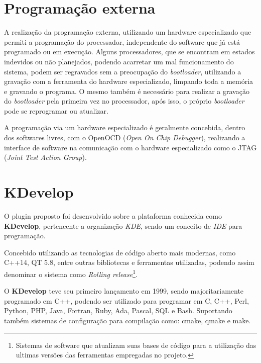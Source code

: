 

\section{Programação externa}
A realização da programação externa, utilizando um hardware especializado que  permiti a programação do processador, independente do software que já está programado ou em execução. Alguns processadores, que se encontram em estados indevidos ou não planejados, podendo acarretar um mal funcionamento do sistema, podem ser regravados sem a preocupação do \textit{bootloader}, utilizando a gravação com a ferramenta do hardware especializado, limpando toda a memória e gravando o programa. O mesmo também é necessário para realizar a gravação do \textit{bootloader} pela primeira vez no processador, após isso, o próprio \textit{bootloader} pode se reprogramar ou atualizar.

A programação via um hardware especializado é geralmente concebida, dentro dos softwares livres, com o OpenOCD (\textit{Open On Chip Debugger})\cite{openocd}, realizando a interface de software na comunicação com o hardware especializado como o JTAG (\textit{Joint Test Action Group}).


\section{KDevelop}
O plugin proposto foi desenvolvido sobre a plataforma conhecida como \textbf{KDevelop}, pertencente a organização \textit{KDE},
sendo um conceito de \textit{IDE} para programação.

Concebido utilizando as tecnologias de código aberto mais modernas, como C++14, QT 5.8, entre outras bibliotecas e ferramentas
utilizadas, podendo assim denominar o sistema como \textit{Rolling release}\footnote{Sistemas de software que atualizam suas bases
de código para a utilização das ultimas versões das ferramentas empregadas no projeto.}.

O \textbf{KDevelop} teve seu primeiro lançamento em 1999, sendo majoritariamente programado em C++, podendo ser utilizado
para programar em C, C++, Perl, Python, PHP, Java, Fortran, Ruby, Ada, Pascal, SQL e Bash. Suportando também sistemas de
configuração para compilação como: cmake, qmake e make.

